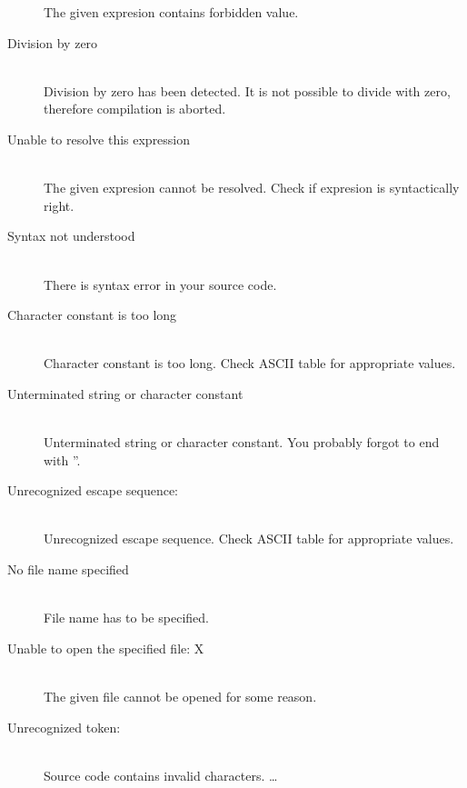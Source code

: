 \begin{description}
                    The given expresion contains forbidden value.
                    \item[Division by zero ] \hfill \\
                    Division by zero has been detected. It is not possible to divide with zero, therefore compilation is aborted.
                    \item[Unable to resolve this expression ] \hfill \\
                    The given expresion cannot be resolved. Check if expresion is syntactically right.
                    \item[Syntax not understood ] \hfill \\
                    There is syntax error in your source code.
                    \item[Character constant is too long ] \hfill \\
                    Character constant is too long. Check ASCII table for appropriate values.
                    \item[Unterminated string or character constant ] \hfill \\
                    Unterminated string or character constant. You probably forgot to end with ''.
                    \item[Unrecognized escape sequence: ] \hfill \\
                    Unrecognized escape sequence. Check ASCII table for appropriate values.
                    \item[No file name specified ] \hfill \\                                                                            %
                    File name has to be specified.
                    \item[Unable to open the specified file: X] \hfill \\
                    The given file cannot be opened for some reason.
                    \item[Unrecognized token:  ] \hfill \\                    %
                    Source code contains invalid characters.
                    \ldots
                    \end{description}

